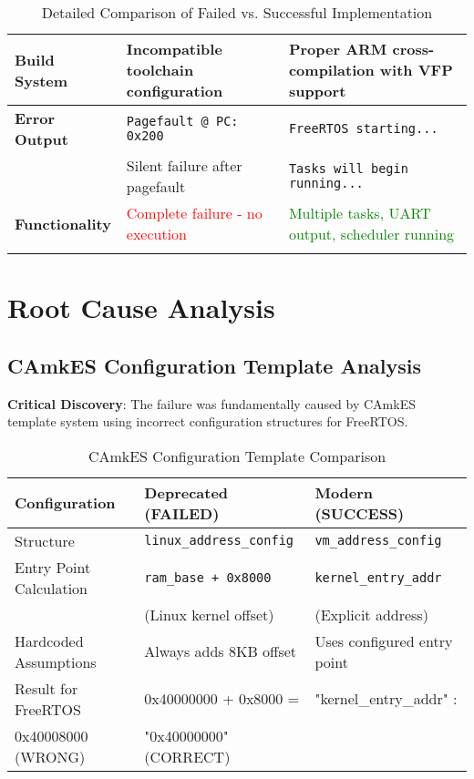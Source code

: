 \documentclass[12pt]{article}
\begin{document}
\begin{longtable}{@{}p{3cm}|p{5cm}|p{5cm}@{}}
\textbf{Build System} &
Incompatible toolchain configuration &
Proper ARM cross-compilation with VFP support \\
\midrule

\textbf{Error Output} &
\texttt{Pagefault @ PC: 0x200} &
\texttt{FreeRTOS starting...} \\
& Silent failure after pagefault &
\texttt{Tasks will begin running...} \\
\midrule

\textbf{Functionality} &
\textcolor{red}{Complete failure - no execution} &
\textcolor{green}{Multiple tasks, UART output, scheduler running} \\

\bottomrule
\caption{Detailed Comparison of Failed vs. Successful Implementation}
\end{longtable}

\section{Root Cause Analysis}

\subsection{CAmkES Configuration Template Analysis}

\textbf{Critical Discovery}: The failure was fundamentally caused by CAmkES template system using incorrect configuration structures for FreeRTOS.

\begin{table}[h]
\centering
\begin{tabular}{|p{4cm}|p{5cm}|p{5cm}|}
\hline
\textbf{Configuration} & \cellcolor{red!20}\textbf{Deprecated (FAILED)} & \cellcolor{green!20}\textbf{Modern (SUCCESS)} \\
\hline
Structure & \texttt{linux\_address\_config} & \texttt{vm\_address\_config} \\
\hline
Entry Point Calculation & 
\texttt{ram\_base + 0x8000} & 
\texttt{kernel\_entry\_addr} \\
& (Linux kernel offset) & (Explicit address) \\
\hline
Hardcoded Assumptions & 
Always adds 8KB offset & 
Uses configured entry point \\
\hline
Result for FreeRTOS & 
0x40000000 + 0x8000 = & 
"kernel\_entry\_addr" : \\
0x40008000 (WRONG) & "0x40000000" (CORRECT) \\
\hline
\end{tabular}
\caption{CAmkES Configuration Template Comparison}
\end{table}
\end{document}
